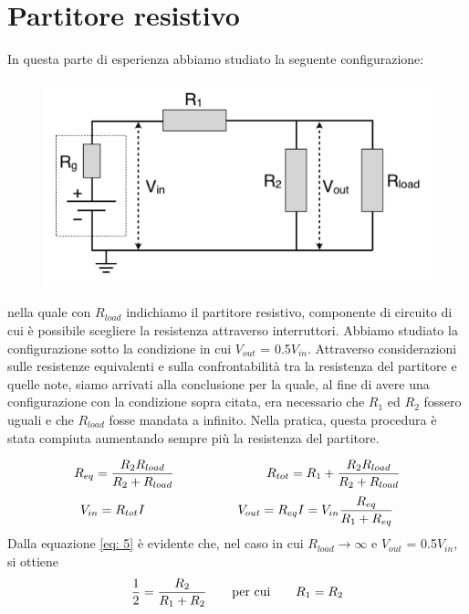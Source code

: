 \section{Partitore resistivo}
In questa parte di esperienza abbiamo studiato la seguente configurazione:

\begin{figure}[H]
    \centering
    \includegraphics[scale=1]{Immagini/PartResist.PNG}
    \label{fig:my_label}
\end{figure}

nella quale con $R_{load}$ indichiamo il partitore resistivo, componente di circuito di cui è possibile scegliere la resistenza attraverso interruttori.
Abbiamo studiato la configurazione sotto la condizione in cui $V_{out}$ = 0.5$V_{in}$.
Attraverso considerazioni sulle resistenze equivalenti e sulla confrontabilità tra la resistenza del partitore e quelle note, siamo arrivati alla conclusione per la quale, al fine di avere una configurazione con la condizione sopra citata, era necessario che $R_{1}$ ed $R_{2}$ fossero uguali e che $R_{load}$ fosse mandata a infinito. Nella pratica, questa procedura è stata compiuta aumentando sempre più la resistenza del partitore.

\begin{equation}
R_{eq} = \frac{R_{2}R_{load}}{R_{2}+R_{load}} \hspace{73 pt} R_{tot} = R_{1}+\frac{R_{2}R_{load}}{R_{2}+R_{load}}
\end{equation}
\begin{equation}
\label{eq: 5}
V_{in} = R_{tot}I \hspace{73 pt} V_{out} = R_{eq}I = V_{in}\frac{R_{eq}}{R_{1}+R_{eq}}  
\end{equation}
\noindent
Dalla equazione \ref{eq: 5} è evidente che, nel caso in cui  $R_{load}\to \infty$ e $V_{out}$ = 0.5$V_{in}$, si ottiene \begin{equation}
\frac{1}{2} = \frac{R_{2}}{R_{1}+R_{2}} \hspace{20 pt} \text{per cui} \hspace{20 pt} R_{1} = R_{2}
\end{equation}

